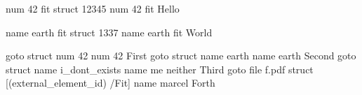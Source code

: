 
\pdfdest num 42 fit
\pdfdest struct 12345 num 42 fit %
Hello

\hfill\eject
\pdfdest name {earth} fit
\pdfdest struct 1337 name {earth} fit %
World

\vfill\eject
\leavevmode
\pdfstartlink goto struct num 42 num 42 First\pdfendlink
\space
\pdfstartlink goto struct name {earth} name {earth} Second\pdfendlink
\space
\pdfstartlink goto struct name {i_dont_exists} name {me neither} Third\pdfendlink
\space
\pdfstartlink goto file {f.pdf} struct {[(external_element_id) /Fit]} name {marcel} Forth\pdfendlink
\bye
